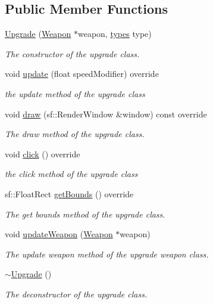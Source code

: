 \subsection*{Public Member Functions}
\begin{DoxyCompactItemize}
\item 
\hyperlink{class_upgrade_aaad9a32e9ef265c0b7a1a63ea599a225}{Upgrade} (\hyperlink{class_weapon}{Weapon} $\ast$weapon, \hyperlink{class_upgrade_a5834f56fecec704c0c9a25158bd09b0b}{types} type)
\begin{DoxyCompactList}\small\item\em The constructor of the upgrade class. \end{DoxyCompactList}\item 
void \hyperlink{class_upgrade_a66b04bde03bdf6ad0935b98963619444}{update} (float speed\+Modifier) override
\begin{DoxyCompactList}\small\item\em the update method of the upgrade class \end{DoxyCompactList}\item 
void \hyperlink{class_upgrade_a01a806588165e9c9059343dec7cc52a3}{draw} (sf\+::\+Render\+Window \&window) const override
\begin{DoxyCompactList}\small\item\em The draw method of the upgrade class. \end{DoxyCompactList}\item 
void \hyperlink{class_upgrade_a1ac674476147c05476d04b9bf6dc0b19}{click} () override
\begin{DoxyCompactList}\small\item\em the click method of the upgrade class \end{DoxyCompactList}\item 
sf\+::\+Float\+Rect \hyperlink{class_upgrade_a680e5842436c75191a9b0564e20ab70e}{get\+Bounds} () override
\begin{DoxyCompactList}\small\item\em The get bounds method of the upgrade class. \end{DoxyCompactList}\item 
void \hyperlink{class_upgrade_a8e86cea146dd2e9a4c69781d9c7d3c8d}{update\+Weapon} (\hyperlink{class_weapon}{Weapon} $\ast$weapon)
\begin{DoxyCompactList}\small\item\em The update weapon method of the upgrade weapon class. \end{DoxyCompactList}\item 
\hyperlink{class_upgrade_a71242d7205c08174f064f4b5b39dedc5}{$\sim$\+Upgrade} ()
\begin{DoxyCompactList}\small\item\em The deconstructor of the upgrade class. \end{DoxyCompactList}\end{DoxyCompactItemize}
